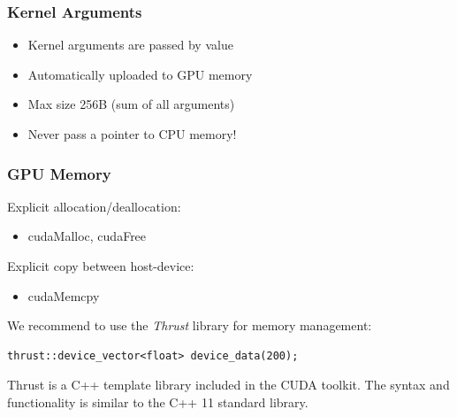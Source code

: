 \documentclass[aspectratio=169]{beamer}
\begin{document}
\begin{frame}[fragile]
\frametitle{Kernel Arguments}

\begin{itemize}
	\item Kernel arguments are passed by value
	\item Automatically uploaded to GPU memory
	\item Max size 256B (sum of all arguments)
	\item Never pass a pointer to CPU  memory!
\end{itemize}
\end{frame}


\begin{frame}[fragile]
	\frametitle{GPU Memory}
	Explicit allocation/deallocation:
	\begin{itemize}
		\item cudaMalloc, cudaFree
	\end{itemize}
	Explicit copy between host-device:
	\begin{itemize}
		\item cudaMemcpy
	\end{itemize}
	We recommend to use the \textit{Thrust} library for memory management:
\begin{lstlisting}
thrust::device_vector<float> device_data(200);
\end{lstlisting}

\begin{mdframed}[frametitle=Note:]
	Thrust is a C++ template library included in the CUDA toolkit. The syntax and functionality is similar to the C++ 11 standard library.
\end{mdframed}
	
\end{frame}


\end{document}
